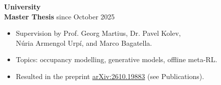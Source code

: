 \documentclass{article}
\begin{document}


\textbf{University} \\


% 

\noindent \textbf{Master Thesis} \hfill since October 2025
\begin{itemize}[noitemsep,nolistsep,leftmargin=*]
    \item Supervision by Prof. Georg Martius, Dr. Pavel Kolev, \\
    Núria Armengol Urpí, and Marco Bagatella.
    \item Topics: occupancy modelling, generative models, offline meta-RL.
    \item Resulted in the preprint \href{https://arxiv.org/abs/2610.19883}{arXiv:2610.19883} (see Publications).\\
\end{itemize}
\end{document}
